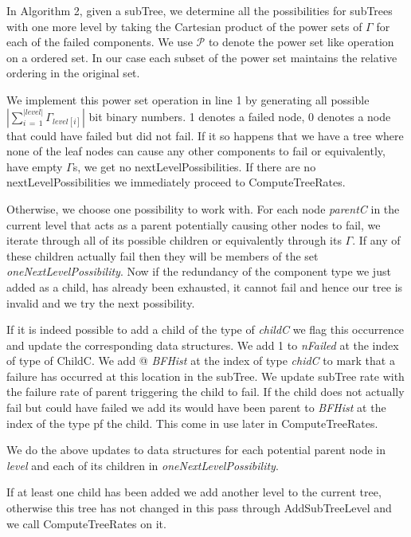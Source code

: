 \documentclass[12pt]{article}
\newcommand{\Varname}[1]{\textrm{\it#1}}
\begin{document}
In Algorithm 2, given a subTree, we determine all the possibilities for subTrees with one more level by taking the Cartesian product of the power sets of $\Gamma$ for each of the failed components. We use $\mathcal{P}$ to denote the power set like operation on a ordered set. In our case each subset of the power set maintains the relative ordering in the original set.

We implement this power set operation in line 1 by generating all possible $|\sum\limits_{i\,=\,1}^{|level|}\Gamma_{level[i]}|$ bit binary numbers. 1 denotes a failed node, 0 denotes a node that could have failed but did not fail. If it so happens that we have a tree where none of the leaf nodes can cause any other components to fail or equivalently, have empty $\Gamma$s, we get no nextLevelPossibilities. If there are no nextLevelPossibilities we immediately proceed to ComputeTreeRates.   

Otherwise, we choose one possibility to work with. For each node \Varname{parentC} in the current level that acts as a parent potentially causing other nodes to fail, we iterate through all of its possible children or equivalently through its $\Gamma$. If any of these children actually fail then they will be members of the set \Varname{oneNextLevelPossibility}. Now if the redundancy of the component type we just added as a child, has already been exhausted, it cannot fail and hence our tree is invalid and we try the next possibility.

If it is indeed possible to add a child of the type of \Varname{childC} we flag this occurrence and update the corresponding data structures. We add 1 to \Varname{nFailed} at the index of type of ChildC. We add @ \Varname{BFHist} at the index of type \Varname{chidC} to mark that a failure has occurred at this location in the subTree. We update subTree rate with the failure rate of parent triggering the child to fail. If the child does not actually fail but could have failed we add its would have been parent to \Varname{BFHist} at the index of the type pf the child. This come in use later in ComputeTreeRates.   

We do the above updates to data structures for each potential parent node in \Varname{level} and each of its children in \Varname{oneNextLevelPossibility}. 

If at least one child has been added we add another level to the current tree, otherwise this tree has not changed in this pass through AddSubTreeLevel and we call ComputeTreeRates on it. 
\end{document}
